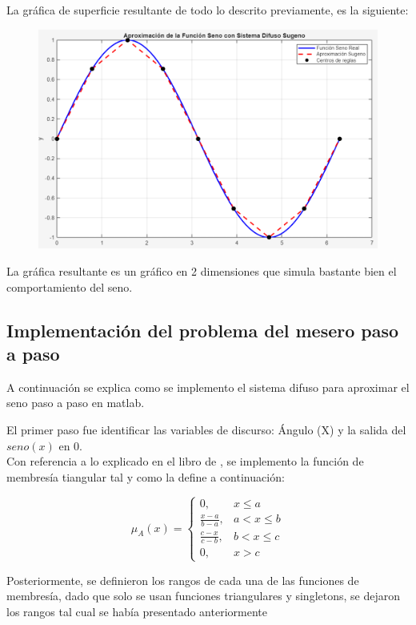 \documentclass[11pt, letterpaper]{article}
\begin{document}
La gráfica de superficie resultante de todo lo descrito previamente, es la siguiente:

\begin{figure}[h]
	\centering
	\includegraphics[width=1\textwidth]{IMG/P13.png}
\end{figure}

La gráfica resultante es un gráfico en 2 dimensiones que simula bastante bien el comportamiento del seno.

\newpage

\subsection{Implementación del problema del mesero paso a paso}

A continuación se explica como se implemento el sistema difuso para aproximar el seno paso a paso en matlab.

El primer paso fue identificar las variables de discurso: Ángulo (X) y la salida del $seno(x)$ en 0.\\

Con referencia a lo explicado en el libro de \cite{Cisneros2004}, se implemento la función de membresía tiangular tal y como la define a continuación:

$$
\mu_A(x) = 
\begin{cases}
	0, & x \le a \\
	\frac{x - a}{b - a}, & a < x \le b \\
	\frac{c - x}{c - b}, & b < x \le c \\
	0, & x > c
\end{cases}
$$


Posteriormente, se definieron los rangos de cada una de las funciones de membresía, dado que solo se usan funciones triangulares y singletons, se dejaron los rangos tal cual se había presentado anteriormente
\end{document}
